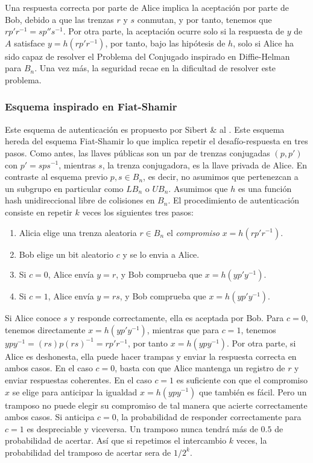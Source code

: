 \documentclass[12pt]{book}
\theoremstyle{definition}
\begin{document}
Una respuesta correcta por parte de Alice implica la aceptación por parte de Bob, debido a que las trenzas $r$ y $s$ conmutan, y por tanto, tenemos que $rp'r^{-1}=sp''s^{-1}$. Por otra parte, la aceptación ocurre solo si la respuesta de $y$ de $A$ satisface $y=h(rp'r^{-1})$, por tanto, bajo las hipótesis de $h$, solo si Alice ha sido capaz de resolver el Problema del Conjugado inspirado en Diffie-Helman para $B_n$. Una vez más, la seguridad recae en la dificultad de resolver este problema.


\subsubsection*{Esquema inspirado en Fiat-Shamir} Este esquema de autenticación es propuesto por Sibert \& al \cite{Sibert}. Este esquema hereda del esquema Fiat-Shamir lo que implica repetir el desafío-respuesta en tres pasos. Como antes, las llaves públicas son un par de trenzas conjugadas $(p,p')$ con $p'=sps^{-1}$, mientras $s$, la trenza conjugadora, es la llave privada de Alice. En contraste al esquema previo $p,s\in B_n$, es decir, no asumimos que pertenezcan a un subgrupo en particular como $LB_n$ o $UB_n$. Asumimos que $h$ es una función hash unidireccional libre de colisiones en $B_n$. El procedimiento de autenticación consiste en repetir $k$ veces los siguientes tres pasos:

\begin{enumerate}
\item Alicia elige una trenza aleatoria $r\in B_n$ el \textit{compromiso} $x=h(rp'r^{-1})$.
\item Bob elige un bit aleatorio $c$ y se lo envia a Alice.
\item Si $c=0$, Alice envía $y=r$, y Bob comprueba que $x=h(yp'y^{-1})$.
\item Si $c=1$, Alice envía $y=rs$, y Bob comprueba que $x=h(yp'y^{-1})$.
\end{enumerate}

Si Alice conoce $s$ y responde correctamente, ella es aceptada por Bob. Para $c=0$, tenemos directamente $x=h(yp'y^{-1})$, mientras que para $c=1$, tenemos $ypy^{-1}=(rs)p(rs)^{-1}=rp'r^{-1}$, por tanto $x=h(ypy^{-1})$. Por otra parte, si Alice es deshonesta, ella puede hacer trampas y enviar la respuesta correcta en ambos casos. En el caso $c=0$, basta con que Alice mantenga un registro de $r$ y enviar respuestas coherentes. En el caso $c=1$ es suficiente con que el compromiso $x$ se elige para anticipar la igualdad $x=h(ypy^{-1})$ que también es fácil. Pero un tramposo no puede elegir su compromiso de tal manera que acierte correctamente ambos casos. Si anticipa $c=0$, la probabilidad de responder correctamente para $c=1$ es despreciable y viceversa. Un tramposo nunca tendrá más de $0.5$ de probabilidad de acertar. Así que si repetimos el intercambio $k$ veces, la probabilidad del tramposo de acertar sera de $1/2^k$.
\end{document}
